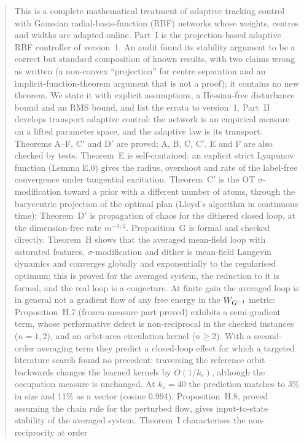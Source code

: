 \begin{abstract}
This is a complete mathematical treatment of adaptive tracking control with Gaussian radial-basis-function
(RBF) networks whose weights, centres and widths are adapted online. Part~I is the projection-based adaptive RBF
controller of version~1. An audit found its stability argument to be a correct but standard composition of known
results, with two claims wrong as written (a non-convex ``projection'' for centre separation and an
implicit-function-theorem argument that is not a proof); it contains no new theorem. We state it with explicit
assumptions, a Hessian-free disturbance bound and an RMS bound, and list the errata to version~1. Part~II develops
transport adaptive control: the network is an empirical measure on a lifted parameter space, and the adaptive law is
its transport. Theorems A--F, C$'$ and D$'$ are proved; A, B, C, C$'$, E and F are also checked by tests.
Theorem~E is self-contained: an explicit strict Lyapunov function (Lemma E.0) gives the radius, overshoot and rate of
the label-free convergence under tangential excitation. Theorem~C$'$ is the OT $\sigma$-modification toward a prior
with a different number of atoms, through the barycentric projection of the optimal plan (Lloyd's algorithm in
continuous time); Theorem~D$'$ is propagation of chaos for the dithered closed loop, at the dimension-free rate
$m^{-1/2}$. Proposition~G is formal and checked directly. Theorem~H shows that the
averaged mean-field loop with saturated features, $\sigma$-modification and dither is mean-field Langevin dynamics and
converges globally and exponentially to the regularised optimum; this is proved for the averaged system, the
reduction to it is formal, and the real loop is a conjecture. At finite gain the averaged loop is in general not a
gradient flow of any free energy in the $\WG$ metric: Proposition~H.7 (frozen-measure part proved) exhibits a
semi-gradient term, whose performative defect is non-reciprocal in the checked instances ($n = 1, 2$), and an
orbit-area circulation kernel ($n \ge 2$). With a second-order averaging term they predict a closed-loop effect for
which a targeted literature search found no precedent: traversing the reference orbit backwards changes the learned
kernels by $O(1/k_e)$, although the occupation measure is unchanged. At $k_e = 40$ the prediction matches to 3\% in
size and 11\% as a vector (cosine 0.994). Proposition~H.8, proved assuming the chain rule for the perturbed flow,
gives input-to-state stability of the averaged system. Theorem~I characterises the non-reciprocity at order

\end{abstract}

